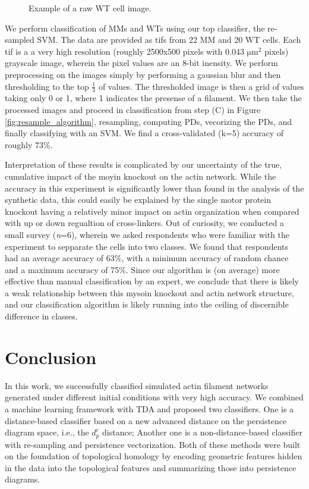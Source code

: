 \documentclass[10pt]{article}
\begin{document}
\begin{figure}[H]
	\begin{center}
	\end{center}
	\caption{Example of a raw WT cell image.}
	\label{fig:wtCell}
\end{figure}

We perform classification of MMs and WTs using our top classifier, the re-sampled SVM. The data are provided as tifs from 22 MM and 20 WT cells. Each tif is a a very high resolution (roughly 2500x500 pixels with 0.043 $\mathrm{\mu m}^2$ pixels) grayscale image, wherein the pixel values are an 8-bit inensity. We perform preprocessing on the images simply by performing a gaussian blur and then thresholding to the top $\frac{1}{3}$ of values. The thresholded image is then a grid of values taking only 0 or 1, where 1 indicates the presense of a filament. We then take the processed images and proceed in classification from step (C) in Figure \ref{fig:resample_algorithm}, resampling, computing PDs, vecorizing the PDs, and finally classifying with an SVM. We find a cross-validated (k=5) accuracy of roughly 73\%.

Interpretation of these results is complicated by our uncertainty of the true, cumulative impact of the moyin knockout on the actin network. While the accuracy in this experiment is significantly lower than found in the analysis of the synthetic data, this could easily be explained by the single motor protein knockout having a relatively minor impact on actin organization when compared with up or down regualtion of cross-linkers. Out of curiosity, we conducted a small survey (\textit{n}=6), wherein we asked respondents who were familiar with the experiment to sepparate the cells into two classes. We found that respondents had an average accuracy of 63\%, with a minimum accuracy of random chance and a maximum accuracy of 75\%. Since our algorithm is (on average) more effective than manual classification by an expert, we conclude that there is likely a weak relationship between this mysoin knockout and actin network structure, and our classification algorithm is likely running into the ceiling of discernible difference in classes.


\section{Conclusion}
In this work, we successfully classified simulated actin filament networks generated under different initial conditions with very high accuracy. We combined a machine learning framework with TDA and proposed two classifiers. One is a distance-based classifier based on a new advanced distance on the persistence diagram space, i.e., the $d^c_p$ distance; Another one is a non-distance-based classifier with re-sampling and persistence vectorization. Both of these methods were built on the foundation of topological homology by encoding geometric features hidden in the data into the topological features and summarizing those into persistence diagrams.
\end{document}
